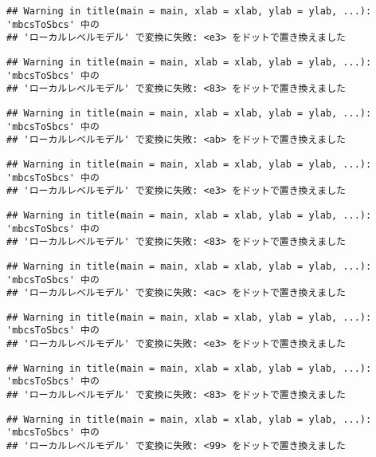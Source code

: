 \documentclass[]{article}
\begin{document}
\begin{verbatim}
## Warning in title(main = main, xlab = xlab, ylab = ylab, ...): 'mbcsToSbcs' 中の
## 'ローカルレベルモデル' で変換に失敗: <e3> をドットで置き換えました
\end{verbatim}

\begin{verbatim}
## Warning in title(main = main, xlab = xlab, ylab = ylab, ...): 'mbcsToSbcs' 中の
## 'ローカルレベルモデル' で変換に失敗: <83> をドットで置き換えました
\end{verbatim}

\begin{verbatim}
## Warning in title(main = main, xlab = xlab, ylab = ylab, ...): 'mbcsToSbcs' 中の
## 'ローカルレベルモデル' で変換に失敗: <ab> をドットで置き換えました
\end{verbatim}

\begin{verbatim}
## Warning in title(main = main, xlab = xlab, ylab = ylab, ...): 'mbcsToSbcs' 中の
## 'ローカルレベルモデル' で変換に失敗: <e3> をドットで置き換えました
\end{verbatim}

\begin{verbatim}
## Warning in title(main = main, xlab = xlab, ylab = ylab, ...): 'mbcsToSbcs' 中の
## 'ローカルレベルモデル' で変換に失敗: <83> をドットで置き換えました
\end{verbatim}

\begin{verbatim}
## Warning in title(main = main, xlab = xlab, ylab = ylab, ...): 'mbcsToSbcs' 中の
## 'ローカルレベルモデル' で変換に失敗: <ac> をドットで置き換えました
\end{verbatim}

\begin{verbatim}
## Warning in title(main = main, xlab = xlab, ylab = ylab, ...): 'mbcsToSbcs' 中の
## 'ローカルレベルモデル' で変換に失敗: <e3> をドットで置き換えました
\end{verbatim}

\begin{verbatim}
## Warning in title(main = main, xlab = xlab, ylab = ylab, ...): 'mbcsToSbcs' 中の
## 'ローカルレベルモデル' で変換に失敗: <83> をドットで置き換えました
\end{verbatim}

\begin{verbatim}
## Warning in title(main = main, xlab = xlab, ylab = ylab, ...): 'mbcsToSbcs' 中の
## 'ローカルレベルモデル' で変換に失敗: <99> をドットで置き換えました
\end{verbatim}
\end{document}
